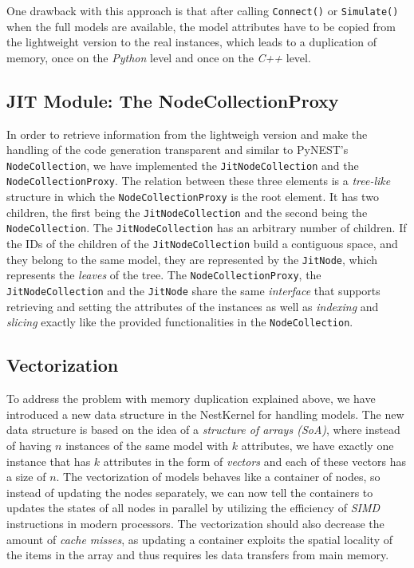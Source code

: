 One drawback with this approach is that after calling \texttt{Connect()} or \texttt{Simulate()} when the full models are available, the model attributes have to be copied from the lightweight version to the real instances, which leads to a duplication of memory, once on the \emph{Python} level and once on the \emph{C++} level.

\subsection*{JIT Module: The NodeCollectionProxy}

In order to retrieve information from the lightweigh version and make the handling of the code generation transparent and similar to PyNEST's \texttt{NodeCollection}, we have implemented the \texttt{JitNodeCollection} and the \texttt{NodeCollectionProxy}. The relation between these three elements is a \emph{tree-like} structure in which the \texttt{NodeCollectionProxy} is the root element. It has two children, the first being the \texttt{JitNodeCollection} and the second being the \texttt{NodeCollection}. The \texttt{JitNodeCollection} has an arbitrary  number of children. If the IDs of the children of the \texttt{JitNodeCollection} build a contiguous space, and they belong to the same model, they are represented by the \texttt{JitNode}, which represents the \emph{leaves} of the tree. The \texttt{NodeCollectionProxy}, the \texttt{JitNodeCollection} and the \texttt{JitNode} share the same \emph{interface} that supports retrieving and setting the attributes of the instances as well as \emph{indexing} and \emph{slicing} exactly like the provided functionalities in the \texttt{NodeCollection}.

\subsection*{Vectorization}

To address the problem with memory duplication explained above, we have introduced a new data structure in the NestKernel for handling models. The new data structure is based on the idea of a \emph{structure of arrays (SoA)}, where instead of having $n$ instances of the same model with $k$ attributes, we have exactly one instance that has $k$ attributes in the form of \emph{vectors} and each of these vectors has a size of $n$. The vectorization of models behaves like a container of nodes, so instead of updating the nodes separately, we can now tell the containers to updates the states of all nodes in parallel by utilizing the efficiency of \emph{SIMD} instructions in modern processors. The vectorization should also decrease the amount of \emph{cache misses}, as updating a container exploits the spatial locality of the items in the array and thus requires les data transfers from main memory.

